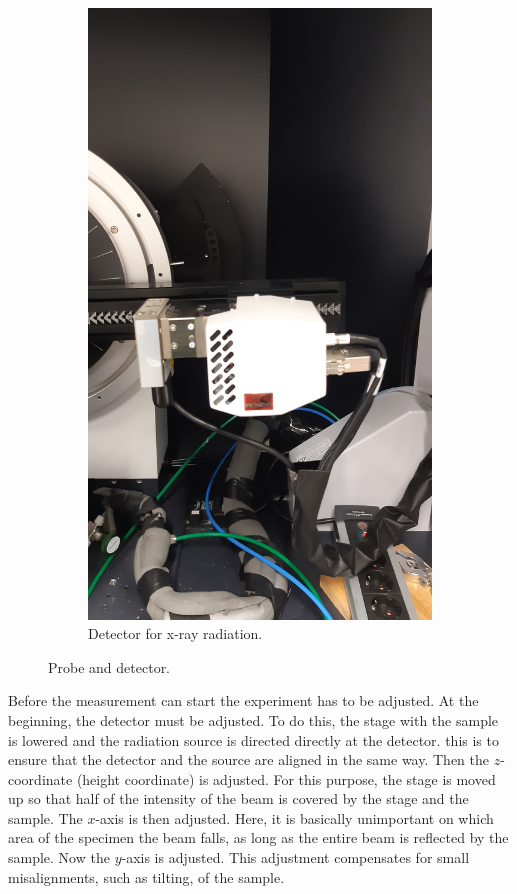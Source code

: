 \begin{figure}
\begin{subfigure}{0.46\textwidth}
    \includegraphics[width=\textwidth, angle=270]{images/detektor.jpg}
    \caption{Detector for x-ray radiation.}
    \label{fig:detector}
  \end{subfigure}
  \caption{Probe and detector.}
  \hfill
\end{figure}

Before the measurement can start the experiment has to be adjusted.
At the beginning, the detector must be adjusted. To do this, the stage with the sample is lowered and the radiation source is directed directly at the detector. this is to ensure that the detector and the source are aligned in the same way.
Then the $z$-coordinate (height coordinate) is adjusted. For this purpose, the stage is moved up so that half of the intensity of the beam is covered by the stage and the sample.
The $x$-axis is then adjusted. Here, it is basically unimportant on which area of the specimen the beam falls, as long as the entire beam is reflected by the sample.
Now the $y$-axis is adjusted. This adjustment compensates for small misalignments, such as tilting, of the sample.

